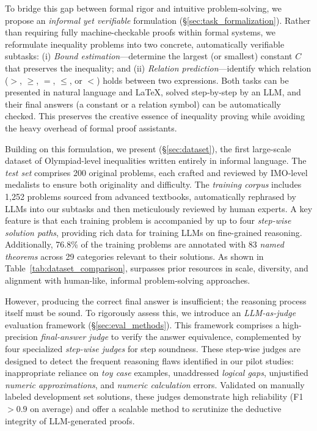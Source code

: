 To bridge this gap between formal rigor and intuitive problem-solving, we propose an \textit{informal yet verifiable} formulation (\S\ref{sec:task_formalization}). Rather than requiring fully machine-checkable proofs within formal systems, we reformulate inequality problems into two concrete, automatically verifiable subtasks: (i) \textit{Bound estimation}—determine the largest (or smallest) constant $C$ that preserves the inequality; and (ii) \textit{Relation prediction}—identify which relation ($>$, $\ge$, $=$, $\le$, or $<$) holds between two expressions. Both tasks can be presented in natural language and \LaTeX, solved step‑by‑step by an LLM, and their final answers (a constant or a relation symbol) can be automatically checked. This preserves the creative essence of inequality proving while avoiding the heavy overhead of formal proof assistants.

Building on this formulation, we present \dataset (\S\ref{sec:dataset}), the first large-scale dataset of Olympiad-level inequalities written entirely in informal language. The \textit{test set} comprises 200 original problems, each crafted and reviewed by IMO-level medalists to ensure both originality and difficulty. The \textit{training corpus} includes 1,252 problems sourced from advanced textbooks, automatically rephrased by LLMs into our subtasks and then meticulously reviewed by human experts. A key feature is that each training problem is accompanied by up to four \textit{step-wise solution paths}, providing rich data for training LLMs on fine-grained reasoning. Additionally, 76.8\% of the training problems are annotated with 83 \textit{named theorems} across 29 categories relevant to their solutions. As shown in Table~\ref{tab:dataset_comparison}, \dataset surpasses prior resources in scale, diversity, and alignment with human-like, informal problem-solving approaches.

However, producing the correct final answer is insufficient; the reasoning process itself must be sound. To rigorously assess this, we introduce an \textit{LLM-as-judge} evaluation framework (\S\ref{sec:eval_methods}). This framework comprises a high-precision \emph{final-answer judge} to verify the answer equivalence, complemented by four specialized \emph{step-wise judges} for step soundness. These step-wise judges are designed to detect the frequent reasoning flaws identified in our pilot studies: inappropriate reliance on \textit{toy case} examples, unaddressed \textit{logical gaps}, unjustified \textit{numeric approximations}, and \textit{numeric calculation} errors. Validated on manually labeled development set solutions, these judges demonstrate high reliability (F1 $> 0.9$ on average) and offer a scalable method to scrutinize the deductive integrity of LLM-generated proofs.

